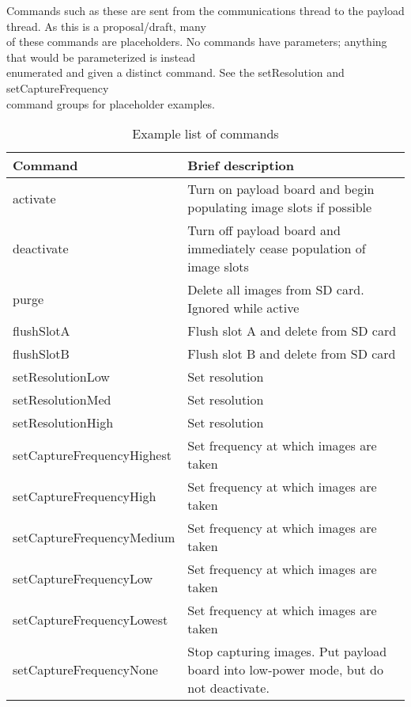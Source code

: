\documentclass{article}
\begin{document}
\begin{table}
\begin{center}
\caption{Example list of commands}
\footnotesize{Commands such as these are sent from the communications thread to the payload
thread. As this is a proposal/draft, many\\ of these commands are placeholders.
No commands have parameters; anything that would be parameterized is instead\\
enumerated and given a distinct command. See the setResolution and 
setCaptureFrequency \\command groups for placeholder examples.}

\begin{tabular}{| l | l |}
    \hline 
    Command & Brief description \\ \hline
    activate & Turn on payload board and begin populating image slots if possible \\ \hline
    deactivate & Turn off payload board and immediately cease population of image slots \\ \hline
    purge & Delete all images from SD card. Ignored while active \\ \hline
    flushSlotA & Flush slot A and delete from SD card \\ \hline
    flushSlotB & Flush slot B and delete from SD card \\ \hline
    setResolutionLow & Set resolution\\ \hline
    setResolutionMed & Set resolution\\ \hline
    setResolutionHigh & Set resolution\\ \hline
    setCaptureFrequencyHighest & Set frequency at which images are taken\\ \hline
    setCaptureFrequencyHigh & Set frequency at which images are taken\\ \hline
    setCaptureFrequencyMedium & Set frequency at which images are taken\\ \hline
    setCaptureFrequencyLow & Set frequency at which images are taken\\ \hline
    setCaptureFrequencyLowest & Set frequency at which images are taken\\ \hline
    setCaptureFrequencyNone & Stop capturing images. Put payload board into low-power mode, but do not deactivate.\\ \hline
\end{tabular}
\end{center}
\end{table}
\end{document}
